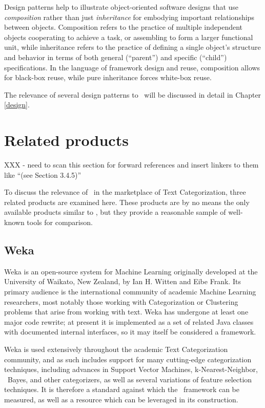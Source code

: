 Design patterns help to illustrate object-oriented software designs
that use \emph{composition} rather than just \emph{inheritance} for
embodying important relationships between objects.  Composition refers
to the practice of multiple independent objects cooperating to achieve
a task, or assembling to form a larger functional unit, while
inheritance refers to the practice of defining a single object's
structure and behavior in terms of both general (``parent'') and
specific (``child'') specifications.  In the language of framework
design and reuse, composition allows for black-box reuse, while pure
inheritance forces white-box reuse.\cite[p. 19]{gamma:95}

The relevance of several design patterns to \aicat\ will be discussed
in detail in Chapter \ref{design}.

\section{Related products}

XXX - need to scan this section for forward references and insert
linkers to them like ``(see Section 3.4.5)''

To discuss the relevance of \aicat\ in the marketplace of Text
Categorization, three related products are examined here.  These
products are by no means the only available products similar to
\aicat, but they provide a reasonable sample of well-known tools for
comparison.

\subsection{Weka}

Weka is an open-source system for Machine Learning originally
developed at the University of Waikato, New Zealand, by Ian H. Witten
and Eibe Frank.\cite{weka:99} Its primary
audience is the international community of academic Machine Learning
researchers, most notably those working with Categorization or
Clustering problems that arise from working with text.  Weka has
undergone at least one major code rewrite; at present it is
implemented as a set of related Java classes with documented internal
interfaces, so it may itself be considered a framework.

Weka is used extensively throughout the academic Text Categorization
community, and as such includes support for many cutting-edge
categorization techniques, including advances in Support Vector
Machines, k-Nearest-Neighbor, \naive\ Bayes, and other categorizers, as
well as several variations of feature selection techniques.  It is
therefore a standard against which the \aicat\ framework can
be measured, as well as a resource which can be leveraged in its
construction.

